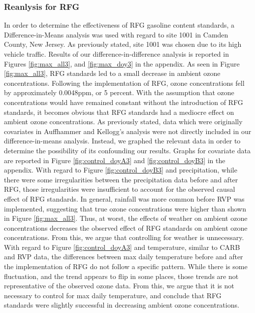 \documentclass{article}
\begin{document}
\subsubsection{Reanlysis for RFG}
In order to determine the effectiveness of RFG gasoline content standards, a Difference-in-Means analysis was used with regard to site 1001 in Camden County, New Jersey.  As previously stated, site 1001 was chosen due to its high vehicle traffic. Results of our difference-in-difference analysis is reported in Figures \ref{fig:max_all3}, and \ref{fig:max_doy3} in the appendix. As seen in Figure \ref{fig:max_all3}, RFG standards led to a small decrease in ambient ozone concentrations. Following the implementation of RFG, ozone concentrations fell by approximately 0.0048ppm, or 5 percent. With the assumption that ozone concentrations would have remained constant without the introduction of RFG standards, it becomes obvious that RFG standards had a mediocre effect on ambient ozone concentrations. As previously stated, data which were originally covariates in Auffhammer and Kellogg's analysis were not directly included in our difference-in-means analysis. Instead, we graphed the relevant data in order to determine the possibility of its confounding our results. Graphs for covariate data are reported in Figure \ref{fig:control_doyA3} and \ref{fig:control_doyB3} in the appendix. With regard to Figure \ref{fig:control_doyB3}  and precipitation, while there were some irregularities between the precipitation data before and after RFG, those irregularities were insufficient to account for the observed causal effect of RFG standards. In general, rainfall was more common before RVP was implemented, suggesting that true ozone concentrations were higher than shown in Figure \ref{fig:max_all3}. Thus, at worst, the effects of weather on ambient ozone concentrations decreases the observed effect of RFG standards on ambient ozone concentrations. From this, we argue that controlling for weather is unnecessary. With regard to Figure \ref{fig:control_doyA3} and temperature, similar to CARB and RVP data, the differences between max daily temperature before and after the implementation of RFG do not follow a specific pattern. While there is some fluctuation, and the trend appears to flip in some places, those trends are not representative of the observed ozone data. From this, we argue that it is not necessary to control for max daily temperature, and conclude that RFG standards were slightly successful in decreasing ambient ozone concentrations.
\end{document}
